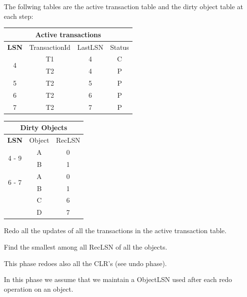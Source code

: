 \documentclass{beamer}
\begin{document}
\begin{slide}{
	\item The follwing tables are the active transaction table and the dirty object table at each step:
	
	\begin{table}
		\tiny
		\begin{tabular}{|c|c|c|c|}
			\hline
			\multicolumn{4}{|c|}{\textbf{Active transactions}} \\
			\hline
			\textbf{LSN} & TransactionId & LastLSN & Status \\
			\hline
			\multirow{2}{*}{4} & T1 & 4 & C \\
			& T2 & 4 & P \\
			\hline
			5 & T2 & 5 & P \\ 
			\hline
			6 & T2 & 6 & P \\
			\hline
			7 & T2 & 7 & P \\
			\hline
		\end{tabular}
	\end{table}
	
	\begin{table}
		\tiny
		\begin{tabular}{|c|c|c|}
			\hline
			\multicolumn{3}{|c|}{\textbf{Dirty Objects}} \\
			\hline
			\textbf{LSN} & Object & RecLSN \\
			\hline
			\multirow{2}{*}{4 - 9} & A & 0 \\
			& B & 1 \\
			\hline
			\multirow{2}{*}{6 - 7} & A & 0 \\
			& B & 1 \\
			& C & 6 \\
			& D & 7 \\
			\hline
		\end{tabular}
	\end{table}
}\end{slide}

\begin{slide}{
	\item Redo all the updates of all the transactions in the active transaction table.
	\item Find the smallest among all RecLSN of all the objects.
	\item This phase redoes also all the CLR's (see undo phase).
	\item In this phase we assume that we maintain a ObjectLSN used after each redo operation on an object. 
}\end{slide}
\end{document}
